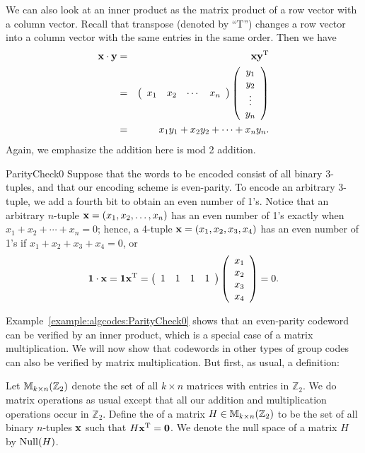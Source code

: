 We can also look at an inner product as the matrix product of a row vector with a column vector. Recall that transpose (denoted by ``T'') changes a row vector into a column vector with the same entries in the same order.
Then we have
\begin{eqnarray*}
{\bold x} \cdot {\bold y} & = & {\bold x}  {\bold y}^{\rm T}
\\
& = &
\left(
\begin{array}{cccc}
x_1 & x_2 & \cdots & x_n
\end{array}
\right)
\left(
\begin{array}{c}
y_1 \\
y_2 \\
\vdots \\
y_n
\end{array}
\right) \\
& = &
x_{1}y_{1} + x_{2}y_{2} + \cdots + x_{n}y_{n}.
\end{eqnarray*}
Again, we emphasize the addition here is mod 2 addition. 

\begin{example}{ParityCheck0}
Suppose that the words to be encoded consist of all binary
3-tuples, 
and that our encoding scheme is even-parity. To encode an arbitrary
3-tuple, we add a fourth bit to obtain an even number of 1's. Notice
that an arbitrary $n$-tuple ${\bold x} = (x_1, x_2, \ldots, x_n)$ has an even number of 1's exactly when $x_1 + x_2 + \cdots + x_n =
0$; hence, a 4-tuple ${\bold x} = (x_1, x_2, x_3, x_4)$ has an
even number of 1's if $ x_1+ x_2+ x_3+ x_4 = 0$, or 
\[
{\bold 1} \cdot {\bold x} 
= 
{\bold 1} {\bold x}^{\rm T} 
=
\left(
\begin{array}{cccc}
1 & 1 & 1 & 1
\end{array}
\right)
\left(
\begin{array}{c}
x_1 \\
x_2 \\
x_3 \\
x_4
\end{array}
\right) = 0.
\]
\end{example} 
Example~\ref{example:algcodes:ParityCheck0} shows that an even-parity codeword can be verified by an inner product, which is a special case of a matrix multiplication. We will now show that codewords in other types of group codes can also be verified by matrix multiplication. But first, as usual, a definition:

\begin{defn} 
Let ${\Bbb M}_{k \times n}(\mathbb{Z}_2)$ denote the set
of all $k \times n$ matrices with entries in $\mathbb{Z}_2$. We do
matrix operations as usual except that all our addition and multiplication
operations occur in $\mathbb{Z}_2$. Define the  of 
a matrix $H \in {\Bbb M}_{k \times n}(\mathbb{Z}_2)$ to be the set of
all binary $n$-tuples ${\bold x}$ such that $H{\bold x}^{\rm T} = {\bold 0}$.
We denote the null space of a matrix $H$ by ${\rm Null}(H)$.  
\end{defn} 
 
